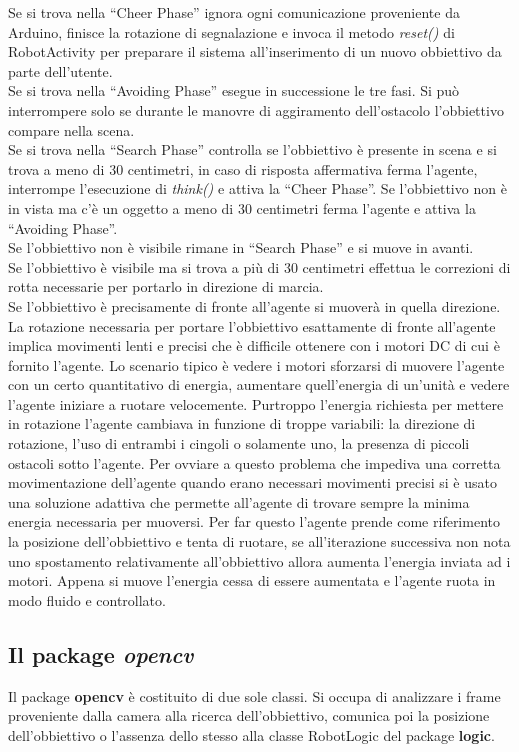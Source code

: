 Se si trova nella ``Cheer Phase'' ignora ogni comunicazione proveniente da 
Arduino, finisce la rotazione di segnalazione e invoca il metodo \emph{reset()} di 
RobotActivity per preparare il sistema all'inserimento di un nuovo obbiettivo da 
parte dell'utente.\\
Se si trova nella ``Avoiding Phase'' esegue in successione le tre fasi. 
Si può interrompere solo se durante le manovre di aggiramento dell'ostacolo
l'obbiettivo compare nella scena.\\
Se si trova nella ``Search Phase'' controlla se l'obbiettivo è presente in scena e 
si trova a meno di 30 centimetri, in caso di risposta affermativa ferma l'agente,
interrompe l'esecuzione di \emph{think()} e attiva la ``Cheer Phase''. 
Se l'obbiettivo non è in vista ma c'è un oggetto a meno di 30 centimetri ferma l'agente
e attiva la ``Avoiding Phase''.\\
Se l'obbiettivo non è visibile rimane in ``Search Phase'' e si muove in avanti.\\
Se l'obbiettivo è visibile ma si trova a più di 30 centimetri effettua le correzioni di rotta
necessarie per portarlo in direzione di marcia.\\
Se l'obbiettivo è precisamente di fronte all'agente si muoverà in quella direzione.\\ 
La rotazione necessaria per portare l'obbiettivo esattamente di fronte all'agente 
implica movimenti lenti e precisi che è difficile ottenere con i motori DC di cui è
fornito l'agente. Lo scenario tipico è vedere i motori sforzarsi di muovere l'agente
con un certo quantitativo di energia, aumentare quell'energia di un'unità e vedere 
l'agente iniziare a ruotare velocemente. Purtroppo l'energia richiesta per 
mettere in rotazione l'agente cambiava in funzione di troppe variabili: 
la direzione di rotazione, l'uso di entrambi i cingoli o solamente uno, 
la presenza di piccoli ostacoli sotto l'agente. Per ovviare a questo problema che impediva 
una corretta movimentazione dell'agente quando erano necessari movimenti precisi 
si è usato una soluzione adattiva che permette all'agente di trovare sempre la 
minima energia necessaria per muoversi. Per far questo l'agente prende come riferimento 
la posizione dell'obbiettivo e tenta di ruotare, se all'iterazione successiva 
non nota uno spostamento relativamente all'obbiettivo allora aumenta 
l'energia inviata ad i motori. Appena si muove l'energia cessa di essere 
aumentata e l'agente ruota in modo fluido e controllato.
\subsection {Il package \textit{opencv}}
Il package \textbf{opencv} è costituito di due sole classi. Si occupa di analizzare 
i frame proveniente dalla camera alla ricerca dell'obbiettivo, comunica poi la posizione 
dell'obbiettivo o l'assenza dello stesso alla classe RobotLogic del package 
\textbf{logic}.
